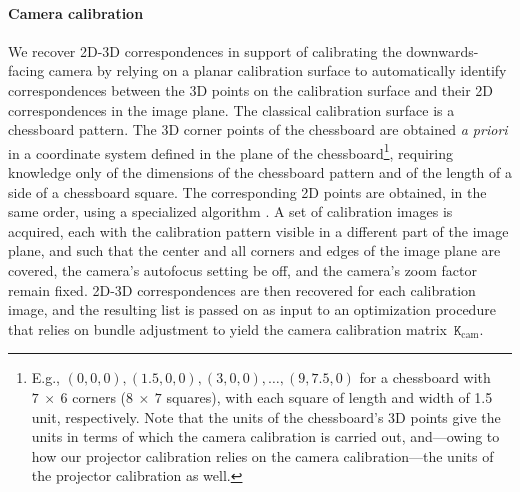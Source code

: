 \documentclass[review]{elsarticle}
\begin{document}
{\paragraph{Camera calibration} We recover 2D-3D correspondences in support of calibrating the downwards-facing camera by relying on a planar calibration surface to automatically identify correspondences between the 3D points on the calibration surface and their 2D correspondences in the image plane. The classical calibration surface is a chessboard pattern. The 3D corner points of the chessboard are obtained \textit{a priori} in a coordinate system defined in the plane of the chessboard\footnote{E.g., $(0,0,0), (1.5,0,0), (3,0,0), \dots, (9,7.5,0)$ for a chessboard with $7~\times{}~6$ corners ($8~\times{}~7$ squares), with each square of length and width of 1.5 unit, respectively. Note that the units of the chessboard's 3D points give the units in terms of which the camera calibration is carried out, and---owing to how our projector calibration relies on the camera calibration---the units of the projector calibration as well.}, requiring knowledge only of the dimensions of the chessboard pattern and of the length of a side of a chessboard square. The corresponding 2D points are obtained, in the same order, using a specialized algorithm \cite{bradski2000opencv}. A set of calibration images is acquired, each with the calibration pattern visible in a different part of the image plane, and such that the center and all corners and edges of the image plane are covered, the camera's autofocus setting be off, and the camera's zoom factor remain fixed. 2D-3D correspondences are then recovered for each calibration image, and the resulting list is passed on as input to an optimization procedure that relies on bundle adjustment to yield the camera calibration matrix~$\mathtt{K}_\text{cam}$. 

}
\end{document}
